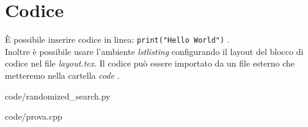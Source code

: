 \section{Codice}

È possibile inserire codice in linea: \verb!print("Hello World")! \cite{knuthwebsite}.\\
Inoltre è possibile usare l'ambiente \textit{lstlisting} configurando il layout del blocco di codice nel file \textit{layout.tex}. Il codice può essere importato da un file esterno che metteremo nella cartella \textit{code} \cite{mori:tesi}.

                    {code/randomized_search.py}
            

                    {code/prova.cpp}